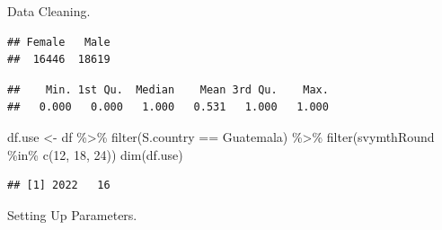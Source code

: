 \documentclass[
]{book}
\newenvironment{Shaded}{\begin{snugshade}}{\end{snugshade}}
\newcommand{\CommentTok}[1]{\textcolor[rgb]{0.56,0.35,0.01}{\textit{#1}}}
\newcommand{\DecValTok}[1]{\textcolor[rgb]{0.00,0.00,0.81}{#1}}
\newcommand{\FunctionTok}[1]{\textcolor[rgb]{0.00,0.00,0.00}{#1}}
\newcommand{\NormalTok}[1]{#1}
\newcommand{\OtherTok}[1]{\textcolor[rgb]{0.56,0.35,0.01}{#1}}
\newcommand{\SpecialCharTok}[1]{\textcolor[rgb]{0.00,0.00,0.00}{#1}}
\newcommand{\StringTok}[1]{\textcolor[rgb]{0.31,0.60,0.02}{#1}}
\begin{document}
Data Cleaning.

\begin{Shaded}
\end{Shaded}

\begin{verbatim}
## Female   Male 
##  16446  18619
\end{verbatim}

\begin{Shaded}
\end{Shaded}

\begin{verbatim}
##    Min. 1st Qu.  Median    Mean 3rd Qu.    Max. 
##   0.000   0.000   1.000   0.531   1.000   1.000
\end{verbatim}

\begin{Shaded}
\begin{Highlighting}[]
\NormalTok{df.use }\OtherTok{\textless{}{-}}\NormalTok{ df }\SpecialCharTok{\%\textgreater{}\%} \FunctionTok{filter}\NormalTok{(S.country }\SpecialCharTok{==} \StringTok{\textquotesingle{}Guatemala\textquotesingle{}}\NormalTok{) }\SpecialCharTok{\%\textgreater{}\%}
  \FunctionTok{filter}\NormalTok{(svymthRound }\SpecialCharTok{\%in\%} \FunctionTok{c}\NormalTok{(}\DecValTok{12}\NormalTok{, }\DecValTok{18}\NormalTok{, }\DecValTok{24}\NormalTok{))}
\FunctionTok{dim}\NormalTok{(df.use)}
\end{Highlighting}
\end{Shaded}

\begin{verbatim}
## [1] 2022   16
\end{verbatim}

Setting Up Parameters.
\end{document}
